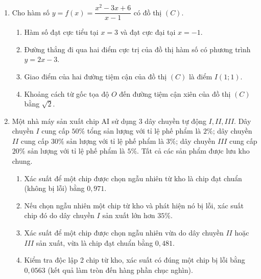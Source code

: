 \documentclass[12pt,a4paper]{article}
\begin{document}
\begin{enumerate}[label=\textbf{Câu \arabic*:}, leftmargin=*]

\item Cho hàm số $y = f(x) = \dfrac{x^2 - 3x + 6}{x - 1}$ có đồ thị $(C)$.
\begin{enumerate}[label=\textbf{\alph*)}]
    \item Hàm số đạt cực tiểu tại $x = 3$ và đạt cực đại tại $x = -1$.
    \item Đường thẳng đi qua hai điểm cực trị của đồ thị hàm số có phương trình $y = 2x - 3$.
    \item Giao điểm của hai đường tiệm cận của đồ thị $(C)$ là điểm $I(1; 1)$.
    \item Khoảng cách từ gốc tọa độ $O$ đến đường tiệm cận xiên của đồ thị $(C)$ bằng $\sqrt{2}$.
\end{enumerate}

\item Một nhà máy sản xuất chip AI sử dụng 3 dây chuyền tự động $I, II, III$. Dây chuyền $I$ cung cấp $50\%$ tổng sản lượng với tỉ lệ phế phẩm là $2\%$; dây chuyền $II$ cung cấp $30\%$ sản lượng với tỉ lệ phế phẩm là $3\%$; dây chuyền $III$ cung cấp $20\%$ sản lượng với tỉ lệ phế phẩm là $5\%$. Tất cả các sản phẩm được lưu kho chung.
\begin{enumerate}[label=\textbf{\alph*)}]
    \item Xác suất để một chip được chọn ngẫu nhiên từ kho là chip đạt chuẩn (không bị lỗi) bằng $0{,}971$.
    \item Nếu chọn ngẫu nhiên một chip từ kho và phát hiện nó bị lỗi, xác suất chip đó do dây chuyền $I$ sản xuất lớn hơn $35\%$.
    \item Xác suất để một chip được chọn ngẫu nhiên vừa do dây chuyền $II$ hoặc $III$ sản xuất, vừa là chip đạt chuẩn bằng $0{,}481$.
    \item Kiểm tra độc lập 2 chip từ kho, xác suất có đúng một chip bị lỗi bằng $0{,}0563$ (kết quả làm tròn đến hàng phần chục nghìn).
\end{enumerate}


\end{enumerate}
\end{document}
